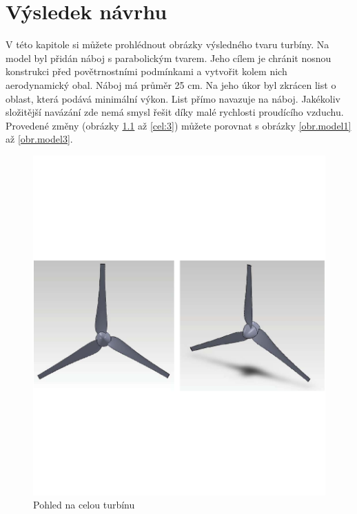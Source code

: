 \chapter{Výsledek návrhu}
V této kapitole si můžete prohlédnout obrázky výsledného tvaru turbíny. Na model byl přidán náboj s parabolickým tvarem. Jeho cílem je chránit nosnou konstrukci před povětrnostními podmínkami a vytvořit kolem nich aerodynamický obal. Náboj má průměr 25 cm. Na jeho úkor byl zkrácen list o oblast, která podává minimální výkon. List přímo navazuje na náboj. Jakékoliv složitější navázání zde nemá smysl řešit díky malé rychlosti proudícího vzduchu. Provedené změny (obrázky \ref{cel:1} až \ref{cel:3}) můžete porovnat s obrázky \ref{obr.model1} až \ref{obr.model3}.
\begin{figure}[H]
	\centering
	\includegraphics[]{obrazky/celek1}
	\caption{Pohled na celou turbínu}
	\label{cel:1}
\end{figure}
